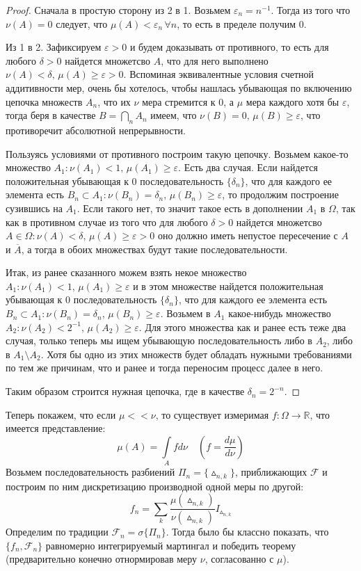 \documentclass[12pt,a4paper]{article} %
\newcommand{\R}{\mathbb{R}}
\newcommand{\F}{\mathcal{F}}
\begin{document}
	\begin{proof}
		Сначала в простую сторону из 2 в 1. Возьмем $\varepsilon_n=n^{-1}$. Тогда из того что $\nu(A)=0$ следует, что $\mu(A)<\varepsilon_n\,\forall n$, то есть в пределе получим 0.
		
		Из 1 в 2. Зафиксируем $\varepsilon>0$ и будем доказывать от противного, то есть для любого $\delta>0$ найдется множетсво $A$, что для него выполнено $\nu(A)<\delta,\,\mu(A)\geq\varepsilon>0$. Вспоминая эквивалентные условия счетной аддитивности мер, очень бы хотелось, чтобы нашлась убывающая по включению цепочка множеств $A_n$, что их $\nu$ мера стремится к 0, а $\mu$ мера каждого хотя бы $\varepsilon$, тогда беря в качестве $B=\bigcap\limits_nA_n$ имеем, что $\nu(B)=0,\,\mu(B)\geq\varepsilon$, что противоречит абсолютной непрерывности.
		
		Пользуясь условиями от противного построим такую цепочку. Возьмем какое-то множество $A_1:\nu(A_1)<1,\,\mu(A_1)\geq\varepsilon$. Есть два случая. Если найдется положительная убывающая к 0 последовательность $\{\delta_n\}$, что для каждого ее элемента есть $B_n\subset A_1:\nu(B_n)=\delta_n,\,\mu(B_n)\geq\varepsilon$, то продолжим построение сузившись на $A_1$. Если такого нет, то значит такое есть в дополнении $A_1$ в $\Omega$, так как в противном случае из того что для любого $\delta>0$ найдется множетсво $A\in\Omega:\nu(A)<\delta,\,\mu(A)\geq\varepsilon>0$ оно должно иметь непустое пересечение с $A$ и $\overline{A}$, а тогда в обоих множествах будут такие последовательности.
		
		Итак, из ранее сказанного можем взять некое множество $A_1:\nu(A_1)<1,\,\mu(A_1)\geq\varepsilon$ и в этом множестве найдется положительная убывающая к 0 последовательность $\{\delta_n\}$, что для каждого ее элемента есть $B_n\subset A_1:\nu(B_n)=\delta_n,\,\mu(B_n)\geq\varepsilon$. Возьмем в $A_1$ какое-нибудь множество $A_2:\nu(A_2)<2^{-1},\,\mu(A_2)\geq\varepsilon$. Для этого множества как и ранее есть теже два случая, только теперь мы ищем убывающую последовательность либо в $A_2$, либо в $A_1\setminus A_2$. Хотя бы одно из этих множеств будет обладать нужными требованиями по тем же причинам, что и ранее и тогда переносим процесс далее в него.
		
		Таким образом строится нужная цепочка, где в качестве $\delta_n=2^{-n}$.
	\end{proof}
	Теперь покажем, что если $\mu<<\nu$, то существует измеримая $f:\Omega\rightarrow\R$, что имеется представление:
	$$\mu(A)=\int\limits_Afd\nu\quad(f=\frac{d\mu}{d\nu})$$
	Возьмем последовательность разбиений $\Pi_n=\{\vartriangle_{n,k}\}$, приближающих $\F$ и построим по ним дискретизацию производной одной меры по другой:
	$$f_n=\sum_k\frac{\mu(\vartriangle_{n,k})}{\nu(\vartriangle_{n,k})}I_{\vartriangle_{n,k}}$$
	Определим по традиции $\F_n=\sigma\{\Pi_n\}$. Тогда было бы классно показать, что $\{f_n,\F_n\}$ равномерно интегрируемый мартингал и победить теорему (предварительно конечно отнормировав меру $\nu$, согласованно с $\mu$).
	
\end{document}
